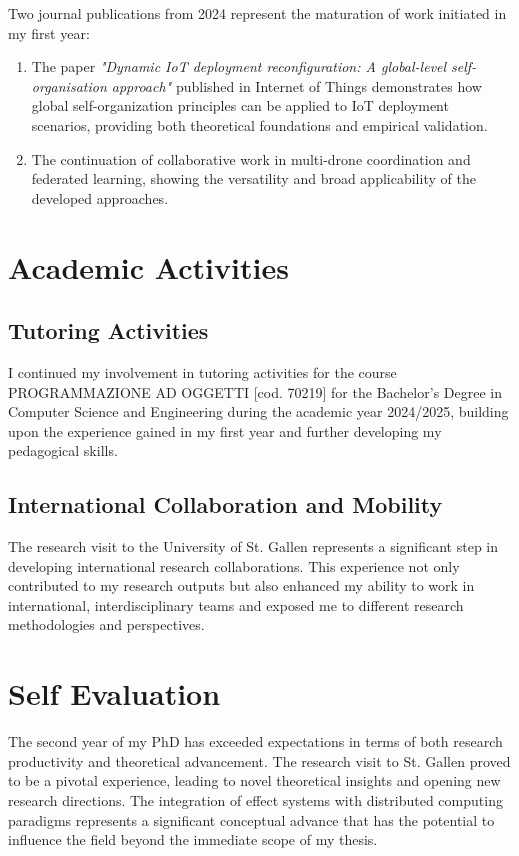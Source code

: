 \documentclass[runningheads]{llncs}
\begin{document}
Two journal publications from 2024 represent the maturation of work initiated in my first year:

\begin{enumerate}
\item The paper \textit{"Dynamic IoT deployment reconfiguration: A global-level self-organisation approach"} published in Internet of Things demonstrates how global self-organization principles can be applied to IoT deployment scenarios, providing both theoretical foundations and empirical validation.

\item The continuation of collaborative work in multi-drone coordination and federated learning, showing the versatility and broad applicability of the developed approaches.
\end{enumerate}

\section{Academic Activities}

\subsection{Tutoring Activities}

I continued my involvement in tutoring activities for the course PROGRAMMAZIONE AD OGGETTI [cod. 70219] for the Bachelor's Degree in Computer Science and Engineering during the academic year 2024/2025, building upon the experience gained in my first year and further developing my pedagogical skills.

\subsection{International Collaboration and Mobility}

The research visit to the University of St. Gallen represents a significant step in developing international research collaborations. This experience not only contributed to my research outputs but also enhanced my ability to work in international, interdisciplinary teams and exposed me to different research methodologies and perspectives.

\section{Self Evaluation}

The second year of my PhD has exceeded expectations in terms of both research productivity and theoretical advancement. The research visit to St. Gallen proved to be a pivotal experience, leading to novel theoretical insights and opening new research directions. The integration of effect systems with distributed computing paradigms represents a significant conceptual advance that has the potential to influence the field beyond the immediate scope of my thesis.
\end{document}
